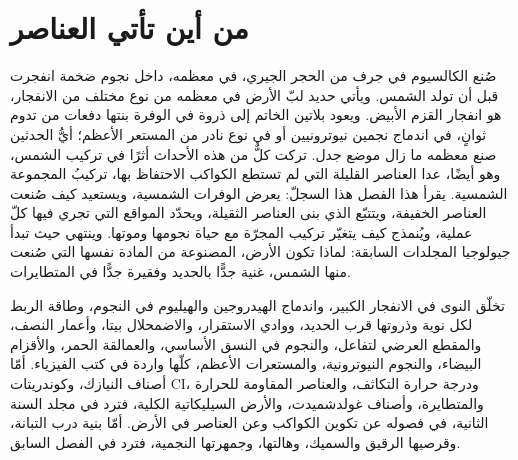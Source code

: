 \chapter{من أين تأتي العناصر}\label{ch:b3:origin-of-elements}

صُنع الكالسيوم في جرف من الحجر الجيري، في معظمه،
داخل نجوم ضخمة انفجرت قبل أن تولد الشمس. ويأتي حديد لبّ الأرض في معظمه
من نوع مختلف من الانفجار، هو انفجار القزم الأبيض. ويعود بلاتين الخاتم
إلى ذروة في الوفرة بنتها دفعات من  تدوم ثوانٍ،
في اندماج نجمين نيوترونيين أو في نوع نادر من المستعر الأعظم؛
أيُّ الحدثين صنع معظمه ما زال
موضع جدل.
تركت كلٌّ من هذه الأحداث أثرًا في تركيب الشمس،
وهو أيضًا، عدا العناصر القليلة التي لم تستطع الكواكب الاحتفاظ بها، تركيبُ المجموعة الشمسية.
يقرأ هذا الفصل هذا السجلّ: يعرض الوفرات الشمسية،
ويستعيد كيف صُنعت العناصر الخفيفة،
ويتتبّع  الذي بنى العناصر الثقيلة،
ويحدّد المواقع التي تجري فيها كلّ عملية،
ويُنمذج كيف يتغيّر تركيب المجرّة مع حياة نجومها وموتها.
وينتهي حيث تبدأ جيولوجيا المجلدات السابقة: لماذا تكون الأرض،
المصنوعة من المادة نفسها التي صُنعت منها الشمس، غنية جدًّا بالحديد وفقيرة جدًّا في المتطايرات.

\begin{recall}
تخلّق النوى في الانفجار الكبير، واندماج الهيدروجين والهيليوم في النجوم،
وطاقة الربط لكل نوية وذروتها قرب الحديد،
ووادي الاستقرار، والاضمحلال بيتا، وأعمار النصف، والمقطع العرضي لتفاعل،
والنجوم في النسق الأساسي، والعمالقة الحمر، والأقزام البيضاء، والنجوم النيوترونية،
والمستعرات الأعظم، كلّها واردة في كتب الفيزياء. أمّا أصناف النيازك،
وكوندريتات CI، ودرجة حرارة التكاثف، والعناصر المقاومة للحرارة والمتطايرة،
وأصناف غولدشميدت، والأرض السيليكاتية الكلية،
فترد في مجلد السنة الثانية،
في فصوله عن تكوين الكواكب وعن العناصر في الأرض. أمّا بنية درب التبانة،
وقرصيها الرقيق والسميك، وهالتها، وجمهرتها النجمية،
فترد في الفصل السابق.
\end{recall}

